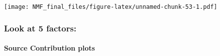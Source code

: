 \documentclass[
]{article}
\newenvironment{Shaded}{\begin{snugshade}}{\end{snugshade}}
\newcommand{\AttributeTok}[1]{\textcolor[rgb]{0.13,0.29,0.53}{#1}}
\newcommand{\FunctionTok}[1]{\textcolor[rgb]{0.13,0.29,0.53}{\textbf{#1}}}
\newcommand{\NormalTok}[1]{#1}
\newcommand{\OtherTok}[1]{\textcolor[rgb]{0.56,0.35,0.01}{#1}}
\newcommand{\SpecialCharTok}[1]{\textcolor[rgb]{0.81,0.36,0.00}{\textbf{#1}}}
\newcommand{\StringTok}[1]{\textcolor[rgb]{0.31,0.60,0.02}{#1}}
\begin{document}
\texttt{[image: NMF\_final\_files/figure-latex/unnamed-chunk-53-1.pdf]}

\subsubsection{Look at 5 factors:}\label{look-at-5-factors-2}

\begin{Shaded}
\end{Shaded}

\paragraph{Source Contribution plots}\label{source-contribution-plots-3}
\end{document}
